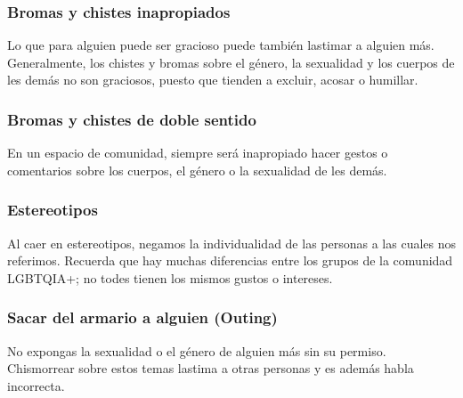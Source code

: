 \documentclass[12pt,openany]{book}
\begin{document}
\subsubsection*{Bromas y chistes inapropiados}

Lo que para alguien puede ser gracioso puede también lastimar a alguien más. Generalmente, los chistes y bromas sobre el género, la sexualidad y los cuerpos de les demás no son graciosos, puesto que tienden a excluir, acosar o humillar. 

\subsubsection*{Bromas y chistes de doble sentido}

En un espacio de comunidad, siempre será inapropiado hacer gestos o comentarios sobre los cuerpos, el género o la sexualidad de les demás.

\subsubsection*{Estereotipos}

Al caer en estereotipos, negamos la individualidad de las personas a las cuales nos referimos. Recuerda que hay muchas diferencias entre los grupos de la comunidad LGBTQIA+; no todes tienen los mismos gustos o intereses.

\subsubsection*{Sacar del armario a alguien (Outing)}

No expongas la sexualidad o el género de alguien más sin su permiso. Chismorrear sobre estos temas lastima a otras personas y es además habla incorrecta.

\begin{figure}[h]
    \centering
\end{figure}
\end{document}
